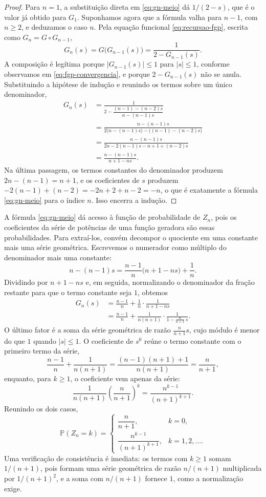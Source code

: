 \documentclass[12pt,portuguese]{article}
\theoremstyle{definition}
\theoremstyle{plainexercise}
\theoremstyle{starredexercise}
\theoremstyle{definition}
\begin{document}
\begin{proof}
Para $n=1$, a substituição direta em \eqref{eq:gn-meio} dá $1/(2-s)$, que é o
valor já obtido para $G_1$. Suponhamos agora que a fórmula valha para $n-1$,
com $n\geqslant 2$, e deduzamos o caso $n$. Pela equação funcional
\eqref{eq:recursao-fgp}, escrita como $G_n=G\circ G_{n-1}$,
\[
G_n(s)=G\bigl(G_{n-1}(s)\bigr)=\frac{1}{2-G_{n-1}(s)}.
\]
A composição é legítima porque $|G_{n-1}(s)|\leqslant 1$ para $|s|\leqslant 1$,
conforme observamos em \eqref{eq:fgp-convergencia}, e porque $2-G_{n-1}(s)$ não
se anula. Substituindo a hipótese de indução e reunindo os termos sobre um único
denominador,
\begin{align*}
G_n(s)
&=\frac{1}{2-\dfrac{(n-1)-(n-2)s}{n-(n-1)s}}
\\[0.3cm]
&=\frac{n-(n-1)s}{2\bigl(n-(n-1)s\bigr)-\bigl((n-1)-(n-2)s\bigr)}
\\[0.3cm]
&=\frac{n-(n-1)s}{2n-2(n-1)s-n+1+(n-2)s}
\\[0.3cm]
&=\frac{n-(n-1)s}{n+1-ns}.
\end{align*}
Na última passagem, os termos constantes do denominador produzem
$2n-(n-1)=n+1$, e os coeficientes de $s$ produzem
$-2(n-1)+(n-2)=-2n+2+n-2=-n$, o que é exatamente a fórmula
\eqref{eq:gn-meio} para o índice $n$. Isso encerra a indução.
\end{proof}

A fórmula \eqref{eq:gn-meio} dá acesso à função de probabilidade de $Z_n$,
pois os coeficientes da série de potências de uma função geradora são essas
probabilidades. Para extraí-los, convém decompor o quociente em uma constante
mais uma série geométrica. Escrevemos o numerador como múltiplo do denominador
mais uma constante:
\[
n-(n-1)s=\frac{n-1}{n}\bigl(n+1-ns\bigr)+\frac{1}{n}.
\]
Dividindo por $n+1-ns$ e, em seguida, normalizando o denominador da fração
restante para que o termo constante seja $1$, obtemos
\begin{align*}
G_n(s)
&=\frac{n-1}{n}+\frac{1}{n}\cdot\frac{1}{n+1-ns}
\\[0.3cm]
&=\frac{n-1}{n}+\frac{1}{n(n+1)}\cdot\frac{1}{1-\frac{n}{n+1}\,s}.
\end{align*}
O último fator é a soma da série geométrica de razão
$\tfrac{n}{n+1}s$, cujo módulo é menor do que $1$ quando $|s|\leqslant 1$. O
coeficiente de $s^0$ reúne o termo constante com o primeiro termo da série,
\[
\frac{n-1}{n}+\frac{1}{n(n+1)}
=\frac{(n-1)(n+1)+1}{n(n+1)}
=\frac{n}{n+1},
\]
enquanto, para $k\geqslant 1$, o coeficiente vem apenas da série:
\[
\frac{1}{n(n+1)}\left(\frac{n}{n+1}\right)^{k}
=\frac{n^{k-1}}{(n+1)^{k+1}}.
\]
Reunindo os dois casos,
\begin{equation}\label{eq:distribuicao-zn-meio}
\mathbb{P}(Z_n=k)=
\begin{cases}
\dfrac{n}{n+1}, & k=0,\\[0.4cm]
\dfrac{n^{k-1}}{(n+1)^{k+1}}, & k=1,2,\ldots.
\end{cases}
\end{equation}
Uma verificação de consistência é imediata: os termos com $k\geqslant 1$ somam
$1/(n+1)$, pois formam uma série geométrica de razão $n/(n+1)$ multiplicada por
$1/(n+1)^2$, e a soma com $n/(n+1)$ fornece $1$, como a normalização exige.
\end{document}
